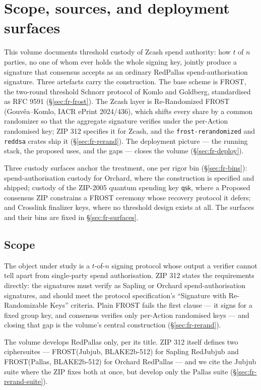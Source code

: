 \documentclass[11pt,a4paper]{article}
\theoremstyle{definition}
\begin{document}
\section{Scope, sources, and deployment surfaces}\label{sec:fr-context}

This volume documents threshold custody of Zcash spend authority: how $t$
of $n$ parties, no one of whom ever holds the whole signing key, jointly
produce a signature that consensus accepts as an ordinary RedPallas
spend-authorisation signature. Three artefacts carry the construction.
The base scheme is FROST, the two-round threshold Schnorr protocol of
Komlo and Goldberg, standardised as RFC 9591 (\S\ref{sec:fr-frost}). The
Zcash layer is Re-Randomized FROST (Gouv\^ea--Komlo, IACR ePrint
2024/436), which shifts every share by a common randomizer so that the
aggregate signature verifies under the per-Action randomised key; ZIP 312
specifies it for Zcash, and the \texttt{frost-rerandomized} and
\texttt{reddsa} crates ship it (\S\ref{sec:fr-rerand}). The deployment
picture --- the running stack, the proposed uses, and the gaps --- closes
the volume (\S\ref{sec:fr-deploy}).

Three custody surfaces anchor the treatment, one per rigor bin
(\S\ref{sec:fr-bins}): spend-authorisation custody for Orchard, where the
construction is specified and shipped; custody of the ZIP-2005 quantum
spending key $\mathsf{qsk}$, where a Proposed consensus ZIP constrains a
FROST ceremony whose recovery protocol it defers; and Crosslink finalizer
keys, where no threshold design exists at all. The surfaces and their
bins are fixed in \S\ref{sec:fr-surfaces}.

\subsection{Scope}\label{sec:fr-scope}

The object under study is a $t$-of-$n$ signing protocol whose output a
verifier cannot tell apart from single-party spend authorisation. ZIP 312
states the requirements directly: the signatures must verify as Sapling or
Orchard spend-authorisation signatures, and should meet the protocol
specification's ``Signature with Re-Randomizable Keys'' criteria. Plain
FROST fails the first clause --- it signs for a fixed group key, and
consensus verifies only per-Action randomised keys --- and closing that
gap is the volume's central construction (\S\ref{sec:fr-rerand}).

The volume develops RedPallas only, per its title. ZIP 312 itself defines
two ciphersuites --- FROST(Jubjub, BLAKE2b-512) for Sapling RedJubjub and
FROST(Pallas, BLAKE2b-512) for Orchard RedPallas --- and we cite the
Jubjub suite where the ZIP fixes both at once, but develop only the
Pallas suite (\S\ref{sec:fr-rerand-suite}).
\end{document}
